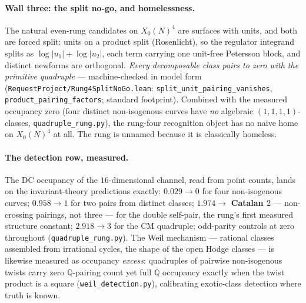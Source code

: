 \documentclass[11pt]{article}
\theoremstyle{definition}
\theoremstyle{remark}
\begin{document}
\paragraph{Wall three: the split no-go, and homelessness.} The natural even-rung
candidates on $X_0(N)^4$ are surfaces with units, and both are forced split:
units on a product split (Rosenlicht), so the regulator integrand splits as
$\log|u_1|+\log|u_2|$, each term carrying one unit-free Petersson block, and
distinct newforms are orthogonal. \emph{Every decomposable class pairs to zero
with the primitive quadruple} --- machine-checked in model form
(\texttt{RequestProject/Rung4SplitNoGo.lean}:
\texttt{split\_unit\_pairing\_vanishes}, \texttt{product\_pairing\_factors};
standard footprint). Combined with the measured occupancy zero (four distinct
non-isogenous curves have \emph{no} algebraic $(1,1,1,1)$-classes,
\texttt{quadruple\_rung.py}), the rung-four recognition object has no naive
home on $X_0(N)^4$ at all. The rung is unnamed because it is classically
homeless.

\paragraph{The detection row, measured.} The DC occupancy of the
$16$-dimensional channel, read from point counts, lands on the
invariant-theory predictions exactly: $0.029\to0$ for four non-isogenous
curves; $0.958\to1$ for two pairs from distinct classes; $1.974\to$
\textbf{Catalan $2$} --- non-crossing pairings, not three --- for the double
self-pair, the rung's first measured structure constant; $2.918\to3$ for the
CM quadruple; odd-parity controls at zero throughout
(\texttt{quadruple\_rung.py}). The Weil mechanism --- rational classes
assembled from irrational cycles, the shape of the open Hodge classes --- is
likewise measured as occupancy \emph{excess}: quadruples of pairwise
non-isogenous twists carry zero $\mathbb Q$-pairing count yet full
$\overline{\mathbb Q}$ occupancy exactly when the twist product is a square
(\texttt{weil\_detection.py}), calibrating exotic-class detection where truth
is known.
\end{document}
